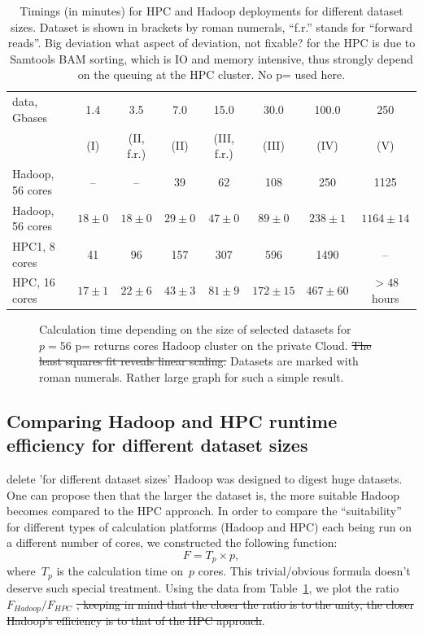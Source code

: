 \documentclass[11pt, oneside]{article}   	%
\newcommand{\COMMENT}[1]{{\color{red} #1 }}
\begin{document}
\begin{table}[htdp]
\small

\caption{Timings  (in minutes) for HPC and  Hadoop deployments for different dataset sizes.    Dataset is shown in brackets by roman numerals, ``f.r.'' stands for ``forward reads''. Big deviation \COMMENT{what aspect of deviation, not fixable?} for the HPC is due to Samtools BAM sorting, which is IO and memory intensive, thus strongly depend on the queuing at the HPC cluster. \COMMENT{No p= used here.} }
\begin{center}
\begin{tabular}{|l|c|c|c|c|c|c|c|}

data, Gbases		&	1.4	&	3.5		&	7.0		&	15.0		&	30.0		&	100.0	&	250 	\\
				&	(I)	&	(II, f.r.)	&	(II)		&	(III, f.r.)	&	(III)		&	(IV)		&	(V)\\
\hline
Hadoop, 56 cores&--&	--	&39		&62	&108	&250&1125\\
Hadoop, 56 cores		&	$18\pm0	$	&	$18\pm0	$	&	$29\pm0$	&	$47\pm0	$	&	$89\pm0$	&	$238\pm1$		&	$1164\pm14$\\
HPC1, 8 cores&	41&	96	&157	&307	&596	&1490&--\\
HPC, 16 cores	&	$17\pm1$	&	$22\pm6$	&	$43\pm3$	&	$81\pm9$	&	$172\pm15$		&	$467\pm60$	& $>48$ hours\\

\end{tabular}
\end{center}
\label{table:4}
\normalsize
\end{table}%




\begin{figure}
	
	\caption{Calculation time depending on the size of selected datasets for~$p=56$ \COMMENT{p= returns} cores Hadoop cluster on the private Cloud. \sout{The least squares fit reveals linear scaling.} Datasets are marked with roman numerals. \COMMENT{Rather large graph for such a simple result.} }
	\label{fig:fig1}
\end{figure}


\subsection{Comparing Hadoop and HPC runtime efficiency for different dataset sizes}
\COMMENT{delete 'for different dataset sizes'} Hadoop was designed to digest huge datasets\cite{hadoop,lin2010}. One can propose then that the larger the dataset is, the more suitable Hadoop becomes compared to the HPC approach. In order to compare the ``suitability'' for different types of calculation platforms (Hadoop and HPC) each being run on a different number of cores, we constructed the following function:
$$F=T_{p}\times p,$$ 
where~$T_{p}$ is the calculation time on~$p$ cores. \COMMENT{This trivial/obvious formula doesn't deserve such special treatment.}
Using the data from Table~\ref{table:4}, we plot the ratio $F_{Hadoop}/F_{HPC}$ \sout{, keeping in mind that the closer the ratio is to the unity, the closer Hadoop's efficiency is to that of the HPC approach}.
\end{document}
